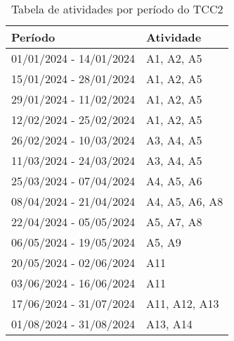 \begin{table}[!ht]
\centering
\begin{tabularx}{\textwidth}{|X|X|}
\hline
\textbf{Período} & \textbf{Atividade} \\
\hline
01/01/2024 - 14/01/2024 & A1, A2, A5 \\ \hline
15/01/2024 - 28/01/2024 & A1, A2, A5 \\ \hline
29/01/2024 - 11/02/2024 & A1, A2, A5 \\ \hline
12/02/2024 - 25/02/2024 & A1, A2, A5 \\ \hline
26/02/2024 - 10/03/2024 & A3, A4, A5 \\ \hline
11/03/2024 - 24/03/2024 & A3, A4, A5 \\ \hline
25/03/2024 - 07/04/2024 & A4, A5, A6  \\ \hline
08/04/2024 - 21/04/2024 & A4, A5, A6, A8 \\ \hline
22/04/2024 - 05/05/2024 & A5, A7, A8 \\ \hline
06/05/2024 - 19/05/2024 & A5, A9 \\ \hline
20/05/2024 - 02/06/2024 & A11 \\ \hline
03/06/2024 - 16/06/2024 & A11 \\ \hline
17/06/2024 - 31/07/2024 & A11, A12, A13 \\ \hline
01/08/2024 - 31/08/2024 & A13, A14 \\ \hline
\end{tabularx}
\caption{Tabela de atividades por período do TCC2}
\end{table}

